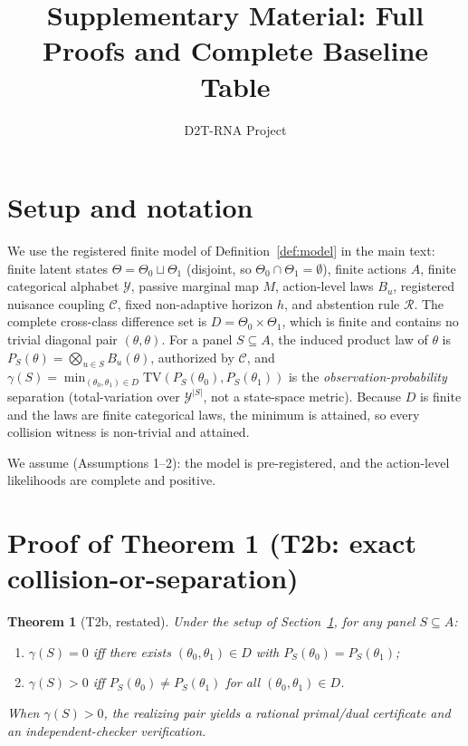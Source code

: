 \documentclass[11pt]{article}
\newtheorem{theorem}{Theorem}
\begin{document}
\title{Supplementary Material: Full Proofs and Complete Baseline Table}
\author{D2T-RNA Project}
\date{}
\maketitle

\section{Setup and notation}\label{sec:setup}
We use the registered finite model of Definition~\ref{def:model} in the main text: finite latent states
$\Theta=\Theta_0\sqcup\Theta_1$ (disjoint, so $\Theta_0\cap\Theta_1=\emptyset$), finite actions $A$, finite
categorical alphabet $\mathcal{Y}$, passive marginal map $M$, action-level laws $B_u$, registered nuisance
coupling $\mathcal{C}$, fixed non-adaptive horizon $h$, and abstention rule $\mathcal{R}$. The complete
cross-class difference set is $D=\Theta_0\times\Theta_1$, which is finite and contains no trivial diagonal
pair $(\theta,\theta)$. For a panel $S\subseteq A$, the induced product law of $\theta$ is
$P_S(\theta)=\bigotimes_{u\in S}B_u(\theta)$, authorized by $\mathcal{C}$, and
$\gamma(S)=\min_{(\theta_0,\theta_1)\in D}\mathrm{TV}(P_S(\theta_0),P_S(\theta_1))$ is the
\emph{observation-probability} separation (total-variation over $\mathcal{Y}^{|S|}$, not a state-space
metric). Because $D$ is finite and the laws are finite categorical laws, the minimum is attained, so every
collision witness is non-trivial and attained.

We assume (Assumptions 1--2): the model is pre-registered, and the action-level likelihoods are
complete and positive.

\section{Proof of Theorem 1 (T2b: exact collision-or-separation)}\label{sec:proof-t2b}

\begin{theorem}[T2b, restated]
Under the setup of Section~\ref{sec:setup}, for any panel $S\subseteq A$:
\begin{enumerate}
  \item $\gamma(S)=0$ iff there exists $(\theta_0,\theta_1)\in D$ with $P_S(\theta_0)=P_S(\theta_1)$;
  \item $\gamma(S)>0$ iff $P_S(\theta_0)\neq P_S(\theta_1)$ for all $(\theta_0,\theta_1)\in D$.
\end{enumerate}
When $\gamma(S)>0$, the realizing pair yields a rational primal/dual certificate and an independent-checker
verification.
\end{theorem}
\end{document}
